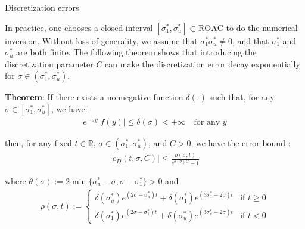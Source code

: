 \documentclass{beamer}
\begin{document}
\begin{frame}{Discretization errors}


    {\footnotesize \scriptsize
    \par In practice, one chooses a closed interval \([\sigma_1^*, \sigma_u^*] \subset \text{ROAC}\) to do the numerical inversion.
     Without loss of generality, we assume that \(\sigma_1^* \sigma_u^* \neq 0\), and that \(\sigma_1^*\) and \(\sigma_u^*\) are both finite. 
     The following theorem shows that introducing 
    the discretization parameter \(C\) can make the discretization error decay exponentially for \(\sigma \in (\sigma_1^*, \sigma_u^*)\).
    \vspace{1em}
    \par  \pause \textbf{Theorem}: If there exists a nonnegative function \(\delta(\cdot)\) such that, for any \(\sigma \in [\sigma_1^*, \sigma_u^*]\), 
    we have:
    \begin{align*}
        e^{-\sigma y} |f(y)| \leq \delta(\sigma) < +\infty \quad \text{for any } y
    \end{align*}
    \par then, for any fixed \( t \in \mathbb{R} \), \(\sigma \in (\sigma_1^*, \sigma_u^*)\), and \(C > 0\), we have the error bound :
    \begin{align*}
        |e_D(t, \sigma, C)| \leq \frac{\rho(\sigma, t)}{e^{\theta(\sigma)C} - 1}
    \end{align*}
    \par where \(\theta(\sigma) := 2 \min\{\sigma_u^* - \sigma, \sigma - \sigma_1^*\} > 0\) and  
    \begin{align*}
        \rho(\sigma, t) := 
    \begin{cases} 
    \delta(\sigma_u^*) e^{(2\sigma - \sigma_u^*)t} + \delta(\sigma_1^*) e^{(3\sigma_1^*-2\sigma)t} & \text{if } t \geq 0\\
    \delta(\sigma_1^*) e^{(2\sigma - \sigma_1^*)t} + \delta(\sigma_u^*) e^{(3\sigma_u^*-2\sigma)t} & \text{if } t < 0
    \end{cases}
    \end{align*}
    }
    
\end{frame}
\end{document}
